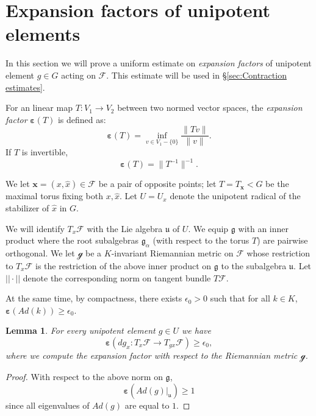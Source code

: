 \documentclass[12pt]{amsbook}%
\newtheorem{lem}[thm]{Lemma}
\theoremstyle{definition}
\theoremstyle{remark}
\numberwithin{section}{chapter}
\numberwithin{subsection}{section}
\numberwithin{figure}{chapter}
\def\eps{\epsilon}
\def\cF{{\mathscr{F}}}
\def\bx{\mathbf{x}}
\def\al{\alpha}
\begin{document}
{{ 
\section{Expansion factors of unipotent elements}  \label{sec:expansion_unipotent}
 
In this section we will prove a uniform estimate on {\em expansion factors} of unipotent element $g\in G$ acting on 
$\cF$. This estimate will be used in \S \ref{sec:Contraction estimates}.  
 
For an linear map $T: V_1\to V_2$ between two normed vector spaces, 
the {\em expansion factor} $\boldsymbol{\varepsilon}(T)$  is defined as:
\begin{equation}
\label{eq:expfac}
\boldsymbol{\varepsilon}(T) = \inf_{v\in V_1-\{0\}} \frac{\|Tv\|}{\|v\|}.  
\end{equation}
If $T$ is invertible,
$$
\boldsymbol{\varepsilon}(T) = \| T^{-1} \|^{-1}.
$$


We let $\bx=(x, \hat{x})\in \cF$ be a pair of opposite points; let $T=T_{\bx}< G$ be the maximal torus fixing both $x, \hat{x}$. 
Let $U=U_x$ denote the unipotent radical of the stabilizer of $\hat{x}$ in $G$.

We will identify $T_x\cF$ with the Lie algebra $\mathfrak{u}$ of $U$. 
We equip $\mathfrak{g}$ with an inner product where the root subalgebras ${\mathfrak g}_\al$ (with respect to the torus $T$) are pairwise orthogonal. 
We let $\mathcal{g}$ be a $K$-invariant Riemannian metric on $\cF$ whose restriction to $T_x\cF$ is the restriction 
 of the above inner product on 
$\mathfrak{g}$ to the subalgebra $\mathfrak{u}$. Let $||\cdot||$ denote the corresponding norm on tangent bundle $T\cF$.


At the same time, by compactness, there exists $\eps_0>0$ such that for all 
$k\in K$, $\boldsymbol{\varepsilon}(Ad (k))\geqslant \eps_0$. 


\begin{lem}\label{lem:unipotent bounds}
For every unipotent element $g\in U$ we have
$$
\boldsymbol{\varepsilon}(dg_x: T_x\cF\to T_{gx}\cF)\geqslant \eps_0,
$$
where we compute the expansion factor with respect to the Riemannian metric $\mathcal{g}$. 
\end{lem}
\begin{proof} With respect to the above norm on $\mathfrak{g}$, 
$$
\boldsymbol{\varepsilon}(Ad(g)|_{\mathfrak{u}})\geqslant 1
$$ 
since all eigenvalues of $Ad(g)$ are equal to $1$. 


\end{proof}}}
\end{document}
